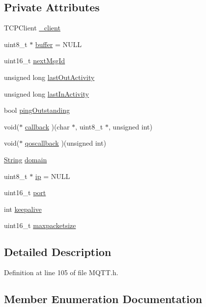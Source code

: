 \subsection*{Private Attributes}
\begin{DoxyCompactItemize}
\item 
T\+C\+P\+Client \hyperlink{class_m_q_t_t_a0180f906b9bbff0f2845900df0e5475d}{\+\_\+client}
\item 
uint8\+\_\+t $\ast$ \hyperlink{class_m_q_t_t_a1d884782e6eec91dabe49b0bb4360a39}{buffer} = N\+U\+LL
\item 
uint16\+\_\+t \hyperlink{class_m_q_t_t_ade1e9fc252b7ca59f30be31439ff84ab}{next\+Msg\+Id}
\item 
unsigned long \hyperlink{class_m_q_t_t_a58a1c0a26b1de2522b79627b224bf1f6}{last\+Out\+Activity}
\item 
unsigned long \hyperlink{class_m_q_t_t_a0a5d8f29e0e75772e0a85b109fa77a04}{last\+In\+Activity}
\item 
bool \hyperlink{class_m_q_t_t_ac02a4988506ab78812a1a9cc91be9007}{ping\+Outstanding}
\item 
void($\ast$ \hyperlink{class_m_q_t_t_ad40d1645b7ec6c7b969883825f0c0469}{callback} )(char $\ast$, uint8\+\_\+t $\ast$, unsigned int)
\item 
void($\ast$ \hyperlink{class_m_q_t_t_a3b5999625aa19e5198896195b5b5149c}{qoscallback} )(unsigned int)
\item 
\hyperlink{class_string}{String} \hyperlink{class_m_q_t_t_a36cef0e2c168c4ce68dda653df6e3be1}{domain}
\item 
uint8\+\_\+t $\ast$ \hyperlink{class_m_q_t_t_a70618323bb75b467ed054dd191397b37}{ip} = N\+U\+LL
\item 
uint16\+\_\+t \hyperlink{class_m_q_t_t_a27559174e21256b6235ff281ba605fe8}{port}
\item 
int \hyperlink{class_m_q_t_t_af93aeb459130c36b2a8d894011f10492}{keepalive}
\item 
uint16\+\_\+t \hyperlink{class_m_q_t_t_aac8cf32807b542ce45a9060d9769f35e}{maxpacketsize}
\end{DoxyCompactItemize}


\subsection{Detailed Description}


Definition at line 105 of file M\+Q\+T\+T.\+h.



\subsection{Member Enumeration Documentation}
\mbox{\label{class_m_q_t_t_a83c67833cdf6dfead0d42e6b48dae8bc}} 
